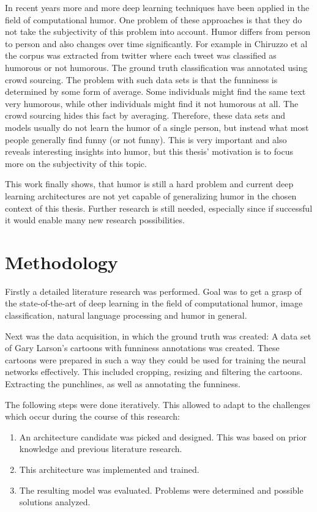 \documentclass[draft,final,oneside]{vutinfth} %
\begin{document}
In recent years more and more deep learning techniques have been applied in the field of computational humor. One problem of these approaches is that they do not take the subjectivity of this problem into account. Humor differs from person to person and also changes over time significantly. For example in Chiruzzo et al \cite{chiruzzo2019overview} the corpus was extracted from twitter where each tweet was classified as humorous or not humorous. The ground truth classification was annotated using crowd sourcing. The problem with such data sets is that the funniness is determined by some form of average. Some individuals might find the same text very humorous, while other individuals might find it not humorous at all. The crowd sourcing hides this fact by averaging. Therefore, these data sets and models usually do not learn the humor of a single person, but instead what most people generally find funny (or not funny). This is very important and also reveals interesting insights into humor, but this thesis' motivation is to focus more on the subjectivity of this topic.

This work finally shows, that humor is still a hard problem and current deep learning architectures are not yet capable of generalizing humor in the chosen context of this thesis. Further research is still needed, especially since if successful it would enable many new research possibilities.


\section{Methodology}

Firstly a detailed literature research was performed. Goal was to get a grasp of the state-of-the-art of deep learning in the field of computational humor, image classification, natural language processing and humor in general.

Next was the data acquisition, in which the ground truth was created: A data set of Gary Larson's cartoons with funniness annotations was created. These cartoons were prepared in such a way they could be used for training the neural networks effectively. This included cropping, resizing and filtering the cartoons. Extracting the punchlines, as well as annotating the funniness.

The following steps were done iteratively. This allowed to adapt to the challenges which occur during the course of this research:

\begin{enumerate}

\item An architecture candidate was picked and designed. This was based on prior knowledge and previous literature research.
\item This architecture was implemented and trained.
\item The resulting model was evaluated. Problems were determined and possible solutions analyzed.

\end{enumerate}
\end{document}
